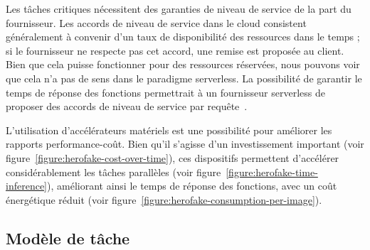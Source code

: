 Les tâches critiques nécessitent des garanties de niveau de service de la part du fournisseur. Les accords de niveau de service dans le cloud consistent généralement à convenir d'un taux de disponibilité des ressources dans le temps ; si le fournisseur ne respecte pas cet accord, une remise est proposée au client. Bien que cela puisse fonctionner pour des ressources réservées, nous pouvons voir que cela n'a pas de sens dans le paradigme serverless. La possibilité de garantir le temps de réponse des fonctions permettrait à un fournisseur serverless de proposer des accords de niveau de service par requête~\cite{zhangMArkExploitingCloud}.

L'utilisation d'accélérateurs matériels est une possibilité pour améliorer les rapports performance-coût. Bien qu'il s'agisse d'un investissement important (voir figure~\ref{figure:herofake-cost-over-time}), ces dispositifs permettent d'accélérer considérablement les tâches parallèles (voir figure~\ref{figure:herofake-time-inference}), améliorant ainsi le temps de réponse des fonctions, avec un coût énergétique réduit (voir figure~\ref{figure:herofake-consumption-per-image}).

\subsection{Modèle de tâche} \label{model:tasks}

